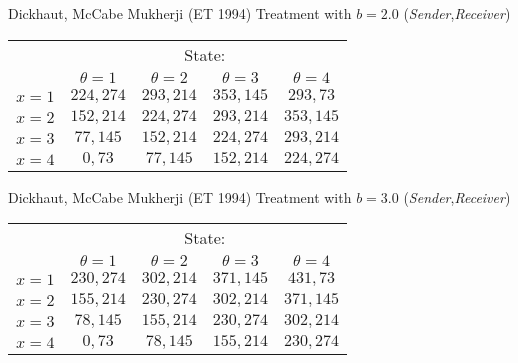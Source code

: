 \documentclass{beamer}
\begin{document}
\begin{frame}{Dickhaut, McCabe Mukherji (ET 1994)}
Treatment with $b=2.0$ (\emph{Sender},\emph{Receiver})

\begin{center}
	\begin{tabular}{r|c|c|c|c|}
			\multicolumn{1}{r}{ }& \multicolumn{4}{c}{State:}		\\
			\multicolumn{1}{r}{ }& \multicolumn{1}{c}{$\theta=1$}  & \multicolumn{1}{c}{$\theta=2$} & \multicolumn{1}{c}{$\theta=3$}& \multicolumn{1}{c}{$\theta=4$} \\ \cline{2-5}
			$x=1$ &  $224,274$ & $293,214$  & $353,145$ & $293,73$  \\ \cline{2-5}
			$x=2$ &  $152,214$ & $224,274$  & $293,214$ & $353,145$ \\ \cline{2-5}
			$x=3$ &  $77,145$  & $152,214$  & $224,274$ & $293,214$  \\ \cline{2-5}
			$x=4$ &  $0,73$    & $77,145$   & $152,214$ & $224,274$    \\ \cline{2-5}
		\end{tabular}
	\end{center}
\end{frame}

\begin{frame}{Dickhaut, McCabe Mukherji (ET 1994)}
Treatment with $b=3.0$ (\emph{Sender},\emph{Receiver})

\begin{center}
	\begin{tabular}{r|c|c|c|c|}
			\multicolumn{1}{r}{ }& \multicolumn{4}{c}{State:}		\\
			\multicolumn{1}{r}{ }& \multicolumn{1}{c}{$\theta=1$}  & \multicolumn{1}{c}{$\theta=2$} & \multicolumn{1}{c}{$\theta=3$}& \multicolumn{1}{c}{$\theta=4$} \\ \cline{2-5}
			$x=1$ &  $230,274$ & $302,214$  & $371,145$ & $431,73$  \\ \cline{2-5}
			$x=2$ &  $155,214$ & $230,274$  & $302,214$ & $371,145$ \\ \cline{2-5}
			$x=3$ &  $78,145$  & $155,214$  & $230,274$ & $302,214$  \\ \cline{2-5}
			$x=4$ &  $0,73$    & $78,145$   & $155,214$  & $230,274$    \\ \cline{2-5}
		\end{tabular}
	\end{center}
\end{frame}
\end{document}
